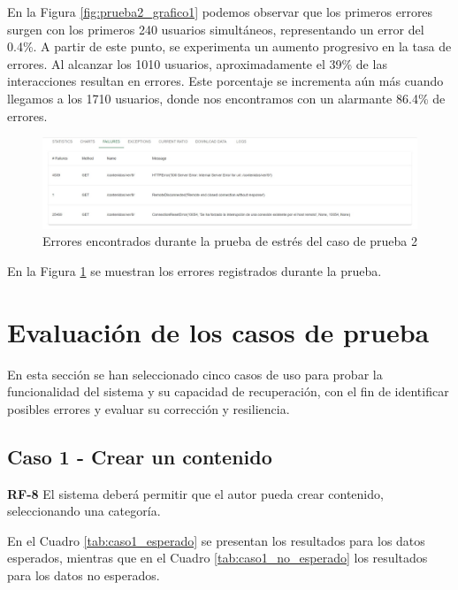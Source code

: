 \documentclass[10pt,times,twocolumn]{article}
\begin{document}
En la Figura \ref{fig:prueba2_grafico1} podemos observar que los primeros errores surgen con los primeros 240 usuarios simultáneos, representando un error del 0.4\%. A partir de este punto, se experimenta un aumento progresivo en la tasa de errores. Al alcanzar los 1010 usuarios, aproximadamente el 39\% de las interacciones resultan en errores. Este porcentaje se incrementa aún más cuando llegamos a los 1710 usuarios, donde nos encontramos con un alarmante 86.4\% de errores.

\begin{figure}[H]
	\centering
	\includegraphics[width=\linewidth]{fig/prueba2_grafico2.jpeg}
	\caption{Errores encontrados durante la prueba de estrés del caso de prueba 2}
	\label{fig:prueba2_grafico2}
\end{figure}

En la Figura \ref{fig:prueba2_grafico2} se muestran los errores registrados durante la prueba.

\section{Evaluación de los casos de prueba}

En esta sección se han seleccionado cinco casos de uso para probar la funcionalidad del sistema y su capacidad de recuperación, con el fin de identificar posibles errores y evaluar su corrección y resiliencia.

\subsection{Caso 1 - Crear un contenido}
\textbf{RF-8} El sistema deberá permitir que  el autor pueda crear contenido, seleccionando una categoría.

En el Cuadro \ref{tab:caso1_esperado} se presentan los resultados para los datos esperados, mientras que en el Cuadro \ref{tab:caso1_no_esperado} los resultados para los datos no esperados.
\end{document}
